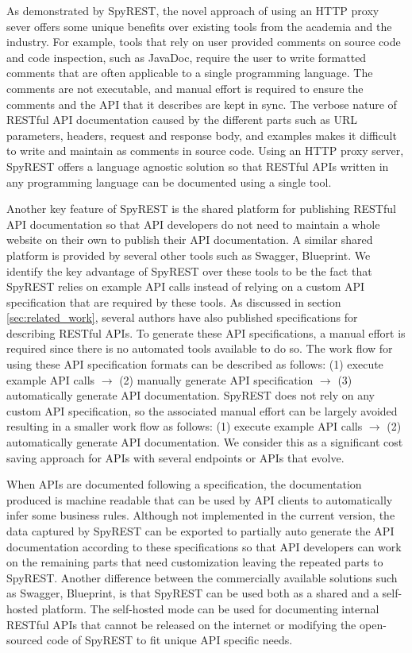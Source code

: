 \documentclass[conference]{IEEEtran}
\begin{document}
As demonstrated by SpyREST, the novel approach of using an HTTP proxy sever offers some unique benefits over existing tools from the academia and the industry. For example, tools that rely on user provided comments on source code and code inspection, such as JavaDoc, require the user to write formatted comments that are often applicable to a single programming language. The comments are not executable, and manual effort is required to ensure the comments and the API that it describes are kept in sync. The verbose nature of RESTful API documentation caused by the different parts such as URL parameters, headers, request and response body, and examples makes it difficult to write and maintain as comments in source code. Using an HTTP proxy server, SpyREST offers a language agnostic solution so that RESTful APIs written in any programming language can be documented using a single tool.

Another key feature of SpyREST is the shared platform for publishing RESTful API documentation so that API developers do not need to maintain a whole website on their own to publish their API documentation. A similar shared platform is provided by several other tools such as Swagger, Blueprint. We identify the key advantage of SpyREST over these tools to be the fact that SpyREST relies on example API calls instead of relying on a custom API specification that are required by these tools. As discussed in section \ref{sec:related_work}, several authors have also published specifications for describing RESTful APIs. To generate these API specifications, a manual effort is required since there is no automated tools available to do so. The work flow for using these API specification formats can be described as follows: (1) execute example API calls $\longrightarrow$ (2) manually generate API specification $\longrightarrow$ (3) automatically generate API documentation. SpyREST does not rely on any custom API specification, so the associated manual effort can be largely avoided resulting in a smaller work flow as follows: (1) execute example API calls $\longrightarrow$ (2) automatically generate API documentation. We consider this as a significant cost saving approach for APIs with several endpoints or APIs that evolve.

When APIs are documented following a specification, the documentation produced is machine readable that can be used by API clients to automatically infer some business rules. Although not implemented in the current version, the data captured by SpyREST can be exported to partially auto generate the API documentation according to these specifications so that API developers can work on the remaining parts that need customization leaving the repeated parts to SpyREST. Another difference between the commercially available solutions such as Swagger, Blueprint, is that SpyREST can be used both as a shared and a self-hosted platform. The self-hosted mode can be used for documenting internal RESTful APIs that cannot be released on the internet or modifying the open-sourced code of SpyREST to fit unique API specific needs.
\end{document}
